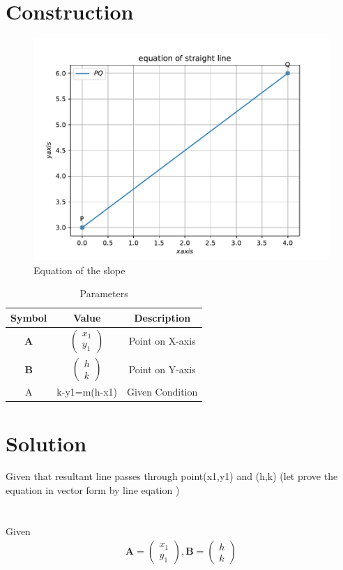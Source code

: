 \documentclass[journal,12pt,twocolumn]{IEEEtran}
\newcommand{\myvec}[1]{\ensuremath{\begin{pmatrix}#1\end{pmatrix}}}
\let\vec\mathbf
\begin{document}
\section{Construction}
\begin{figure}[h]
    \centering
\includegraphics[width=\columnwidth]{figure.pdf}
    \caption{Equation of the slope}
    \label{fig:my_label}
\end{figure}
\vspace{2cm}
\begin{table}[h]
    \centering
    \begin{tabular}{|c|c|c|}
       \hline
       \textbf{Symbol}&\textbf{Value}&\textbf{Description}  \\
       \hline
	    $\vec{A}$ & $\myvec{
		    x_1\\
		    y_1}$
	    & Point on X-axis\\
        \hline
	    $\vec{B}$ & $\myvec{h\\k}$
 & Point on Y-axis\\
        \hline
        \hline
        A & k-y1=m(h-x1) & Given Condition\\
        \hline
    \end{tabular}
    \caption{Parameters}
    \label{tab:my_label}
\end{table}


\section{Solution}
Given that resultant line passes through point(x1,y1) and (h,k) (let prove the equation in vector form by line eqation ) \\
\\
\\
\fi
Given 
\begin{align}
\vec{A}=\myvec{
  x_1\\
  y_1}
 , \vec{B}=\myvec{
  h\\
  k}
\end{align}
\end{document}
